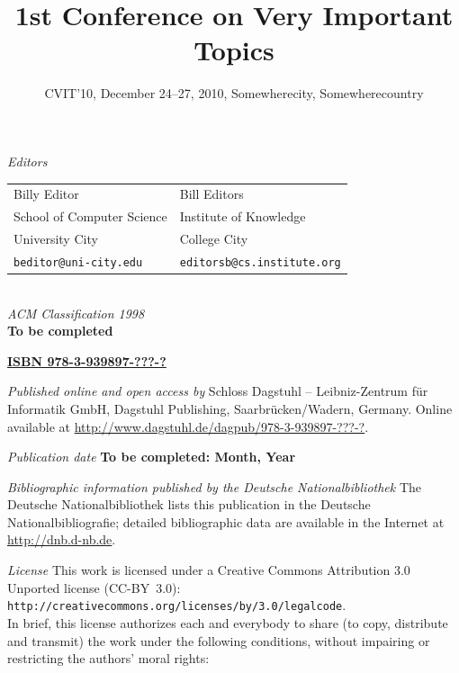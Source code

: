 \documentclass[a4paper,UKenglish]{lipicsmaster}
\title{\huge 1st Conference on Very Important Topics}
\subtitle{CVIT'10, December 24--27, 2010, Somewherecity, Somewherecountry}
\begin{document}
\frontmatter

\maketitle

\begin{publicationinfo}%
\sffamily

\emph{Editors} \\[0.2cm]
\begin{tabular}{ll}
Billy Editor              &   Bill Editors   \\
School of Computer Science   &  Institute of Knowledge \\ 
University City & College City \\ 
\texttt{beditor@uni-city.edu} &  \texttt{editorsb@cs.institute.org}
\end{tabular}
\ \\

\bigskip
\bigskip
\bigskip
\bigskip
\emph{ACM Classification 1998}\\
\textbf{To be completed}

\bigskip
\bigskip

{\Large\bf\sffamily \href{http://www.dagstuhl.de/dagpub/978-3-939897-???-?}{ISBN 978-3-939897-???-?}}

\bigskip
\bigskip

\emph{Published online and open access by}\newline
Schloss Dagstuhl -- Leibniz-Zentrum f\"ur Informatik GmbH, Dagstuhl Publishing, Saarbr\"ucken/Wadern, Germany. Online available at \href{http://www.dagstuhl.de/dagpub/978-3-939897-???-?}{http://www.dagstuhl.de/dagpub/978-3-939897-???-?}.

\bigskip
\emph{Publication date}\newline
\textbf{To be completed: Month, Year}

\bigskip
\bigskip

\emph{Bibliographic information published by the Deutsche Nationalbibliothek}\newline
The Deutsche Nationalbibliothek lists this publication in the Deutsche Nationalbibliografie; detailed bibliographic data are available in the Internet at \href{http://dnb.d-nb.de}{http://dnb.d-nb.de}. 

\bigskip

\emph{License}\newline
This work is licensed under a Creative Commons Attribution 3.0 Unported license (CC-BY~3.0): \texttt{http://creativecommons.org/licenses/by/3.0/legalcode}.\\
In brief, this license authorizes each and everybody to share (to copy, distribute and transmit) the work under the following conditions, without impairing or restricting the authors' moral rights:


\end{publicationinfo}
\end{document}
